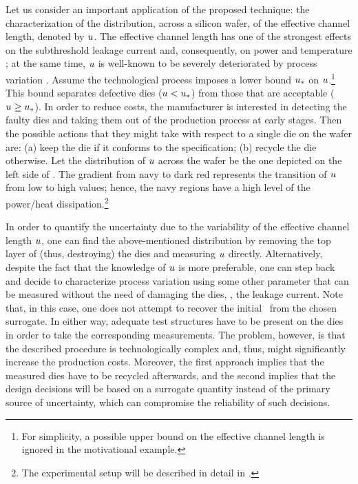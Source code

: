 
Let us consider an important application of the proposed technique: the characterization of the distribution, across a silicon wafer, of the effective channel length, denoted by $u$. The effective channel length has one of the strongest effects on the subthreshold leakage current and, consequently, on power and temperature \cite{juan2011, juan2012}; at the same time, $u$ is well-known to be severely deteriorated by process variation \cite{chandrakasan2001, srivastava2010}.
Assume the technological process imposes a lower bound $u_*$ on $u$.\footnote{For simplicity, a possible upper bound on the effective channel length is ignored in the motivational example.} This bound separates defective dies ($u < u_*$) from those that are acceptable ($u \geq u_*$).
In order to reduce costs, the manufacturer is interested in detecting the faulty dies and taking them out of the production process at early stages.
Then the possible actions that they might take with respect to a single die on the wafer are: (a) keep the die if it conforms to the specification; (b) recycle the die otherwise.
Let the distribution of $u$ across the wafer be the one depicted on the left side of .
The gradient from navy to dark red represents the transition of $u$ from low to high values; hence, the navy regions have a high level of the power/heat dissipation.\footnote{The experimental setup will be described in detail in .}

In order to quantify the uncertainty due to the variability of the effective channel length $u$, one can find the above-mentioned distribution by removing the top layer of (thus, destroying) the dies and measuring $u$ directly.
Alternatively, despite the fact that the knowledge of $u$ is more preferable, one can step back and decide to characterize process variation using some other parameter that can be measured without the need of damaging the dies, \eg, the leakage current.
Note that, in this case, one does not attempt to recover the initial \qoi\ from the chosen surrogate.
In either way, adequate test structures have to be present on the dies in order to take the corresponding measurements.
The problem, however, is that the described procedure is technologically complex and, thus, might significantly increase the production costs.
Moreover, the first approach implies that the measured dies have to be recycled afterwards, and the second implies that the design decisions will be based on a surrogate quantity instead of the primary source of uncertainty, which can compromise the reliability of such decisions.

